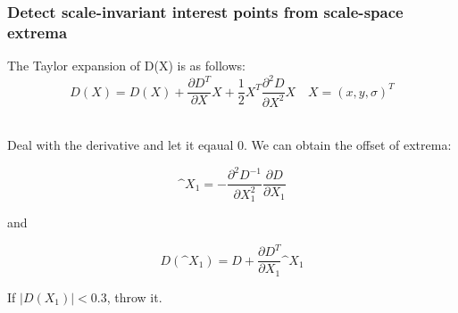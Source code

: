 \documentclass[notheorems, serif, table, compress]{beamer}  %
\begin{document}
\begin{frame}[fragile]
\frametitle{Detect scale-invariant interest points from scale-space extrema}%
The Taylor expansion  of D(X) is as follows:
\begin{equation}
D(X)=D(X)+\frac{\partial D^{T}}{\partial X}X+\frac{1}{2}X^{T}\frac{\partial ^{2}D}{\partial X^{2}}X \quad X=(x,y,\sigma)^{T}
\end{equation}



\quad\\

Deal with the derivative and let it eqaual 0. We can obtain the offset of extrema:

\begin{equation}
\^{X_1}=-\frac{\partial ^{2}D^{-1}}{\partial X_{1}^{2}}\frac{\partial D}{\partial X_1}
\end{equation}

and

\begin{equation}
D(\^{X_1})=D+\frac{\partial D^{T}}{\partial {X_1}}\^{X_1}
\end{equation}

If $\left|D(X_1)\right|<0.3$, throw it.


  

\end{frame}
\end{document}
